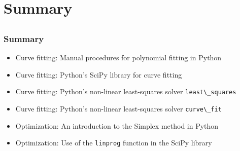 \section{Summary}
\subsection*{}
\begin{frame}
  \frametitle{Summary}
  \begin{itemize}
    \item Curve fitting: Manual procedures for polynomial fitting in Python
    \item Curve fitting: Python's SciPy library for curve fitting
    \item Curve fitting: Python's non-linear least-squares solver \lstinline$least\_squares$
    \item Curve fitting: Python's non-linear least-squares solver \lstinline$curve\_fit$
    \item Optimization: An introduction to the Simplex method in Python
    \item Optimization: Use of the \lstinline$linprog$ function in the SciPy library
  \end{itemize}
\end{frame}
